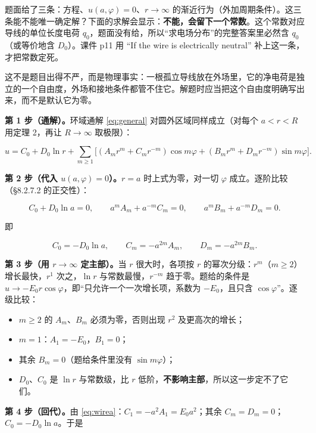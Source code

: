 
题面给了三条：方程、$u(a,\varphi)=0$、$r\to\infty$ 的渐近行为（外加周期条件）。这三条能不能唯一确定解？下面的求解会显示：\textbf{不能，会留下一个常数}。这个常数对应导线的单位长度电荷 $q_0$，题面没有给，所以“求电场分布”的完整答案里必然含 $q_0$（或等价地含 $D_0$）。课件 p11 用 “If the wire is electrically neutral” 补上这一条，才把常数定死。

这不是题目出得不严，而是物理事实：一根孤立导线放在外场里，它的净电荷是独立的一个自由度，外场和接地条件都管不住它。解题时应当把这个自由度明确写出来，而不是默认它为零。


\textbf{第 1 步（通解）。}环域通解 \eqref{eq:general} 对圆外区域同样成立（对每个 $a<r<R$ 用定理 2，再让 $R\to\infty$ 取极限）：

\[
u=C_0+D_0\ln r+\sum_{m\ge1}\big[(A_mr^m+C_mr^{-m})\cos m\varphi+(B_mr^m+D_mr^{-m})\sin m\varphi\big].
\]

\textbf{第 2 步（代入 $u(a,\varphi)=0$）。}$r=a$ 时上式为零，对一切 $\varphi$ 成立。逐阶比较（\S8.2.7.2 的正交性）：

\[
C_0+D_0\ln a=0,\qquad
a^mA_m+a^{-m}C_m=0,\qquad
a^mB_m+a^{-m}D_m=0 .
\]

即

\begin{equation}
C_0=-D_0\ln a,\qquad C_m=-a^{2m}A_m,\qquad D_m=-a^{2m}B_m .
\label{eq:wirea}
\end{equation}

\textbf{第 3 步（用 $r\to\infty$ 定主部）。}当 $r$ 很大时，各项按 $r$ 的幂次分级：$r^m$（$m\ge2$）增长最快，$r^1$ 次之，$\ln r$ 与常数最慢，$r^{-m}$ 趋于零。题给的条件是 $u\to-E_0r\cos\varphi$，即“只允许一个一次增长项，系数为 $-E_0$，且只含 $\cos\varphi$”。逐级比较：

\begin{itemize}
  \item $m\ge2$ 的 $A_m$、$B_m$ 必须为零，否则出现 $r^2$ 及更高次的增长；
  \item $m=1$：$A_1=-E_0$，$B_1=0$；
  \item 其余 $B_m=0$（题给条件里没有 $\sin m\varphi$）；
  \item $D_0$、$C_0$ 是 $\ln r$ 与常数级，比 $r$ 低阶，\textbf{不影响主部}，所以这一步定不了它们。
\end{itemize}

\textbf{第 4 步（回代）。}由 \eqref{eq:wirea}：$C_1=-a^2A_1=E_0a^2$；其余 $C_m=D_m=0$；$C_0=-D_0\ln a$。于是

